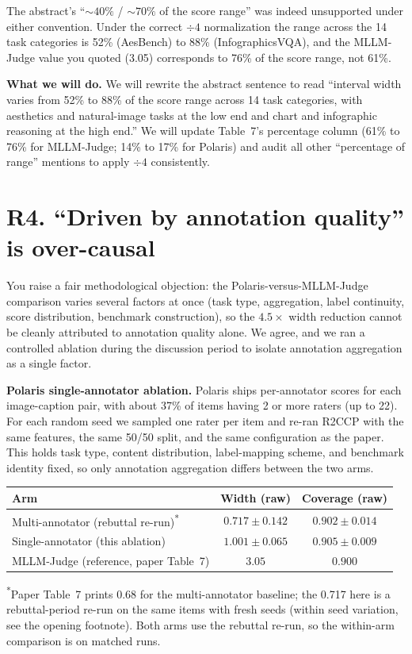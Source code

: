 \documentclass[11pt]{article}
\begin{document}
The abstract's ``$\sim 40\%$ / $\sim 70\%$ of the score range'' was indeed unsupported under either convention. Under the correct $\div 4$ normalization the range across the 14 task categories is 52\% (AesBench) to 88\% (InfographicsVQA), and the MLLM-Judge value you quoted (3.05) corresponds to 76\% of the score range, not 61\%.

\textbf{What we will do.} We will rewrite the abstract sentence to read ``interval width varies from 52\% to 88\% of the score range across 14 task categories, with aesthetics and natural-image tasks at the low end and chart and infographic reasoning at the high end.'' We will update Table~7's percentage column (61\% to 76\% for MLLM-Judge; 14\% to 17\% for Polaris) and audit all other ``percentage of range'' mentions to apply $\div 4$ consistently.

\section*{R4. ``Driven by annotation quality'' is over-causal}

You raise a fair methodological objection: the Polaris-versus-MLLM-Judge comparison varies several factors at once (task type, aggregation, label continuity, score distribution, benchmark construction), so the $4.5\times$ width reduction cannot be cleanly attributed to annotation quality alone. We agree, and we ran a controlled ablation during the discussion period to isolate annotation aggregation as a single factor.

\textbf{Polaris single-annotator ablation.} Polaris ships per-annotator scores for each image-caption pair, with about 37\% of items having 2 or more raters (up to 22). For each random seed we sampled one rater per item and re-ran R2CCP with the same features, the same 50/50 split, and the same configuration as the paper. This holds task type, content distribution, label-mapping scheme, and benchmark identity fixed, so only annotation aggregation differs between the two arms.

\begin{center}
\small
\begin{tabular}{lcc}
\toprule
\textbf{Arm} & \textbf{Width (raw)} & \textbf{Coverage (raw)} \\
\midrule
Multi-annotator (rebuttal re-run)\textsuperscript{*} & $0.717 \pm 0.142$ & $0.902 \pm 0.014$ \\
Single-annotator (this ablation)                     & $\mathbf{1.001 \pm 0.065}$ & $0.905 \pm 0.009$ \\
MLLM-Judge (reference, paper Table~7)                & $3.05$ & $0.900$ \\
\bottomrule
\end{tabular}
\end{center}
\footnotesize\textsuperscript{*}Paper Table~7 prints 0.68 for the multi-annotator baseline; the 0.717 here is a rebuttal-period re-run on the same items with fresh seeds (within seed variation, see the opening footnote). Both arms use the rebuttal re-run, so the within-arm comparison is on matched runs.\normalsize
\end{document}
